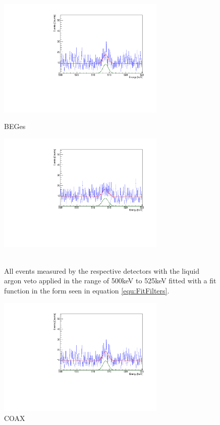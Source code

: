 \begin{figure}[t!]
	\centering
	\begin{minipage}{.5\textwidth}
		\centering
		\includegraphics[width=80mm]{./Bilder/500525FitLArVetoBEGes.pdf}
		\caption{BEGes}
		\label{fig:FitLArVetoBEGes}
	\end{minipage}%
	\begin{minipage}{.5\textwidth}
		\centering
		\includegraphics[width=80mm]{./Bilder/500525FitLArVetoCOAX.pdf}
		\caption{COAX}
		\label{fig:FitLArVetoCOAX}
	\end{minipage}
	\\
	\vspace{0.5cm}
	All events measured by the respective detectors  with the liquid argon veto applied in the range of 500keV to 525keV fitted with a fit function in the form seen in equation \ref{equ:FitFilters}.
	\\
	\vspace{0.5cm}
	\begin{minipage}{.5\textwidth}
		\centering
		\includegraphics[width=80mm]{./Bilder/500525FitLArVetoEventListBEGes.pdf}

\end{minipage}
\end{figure}
